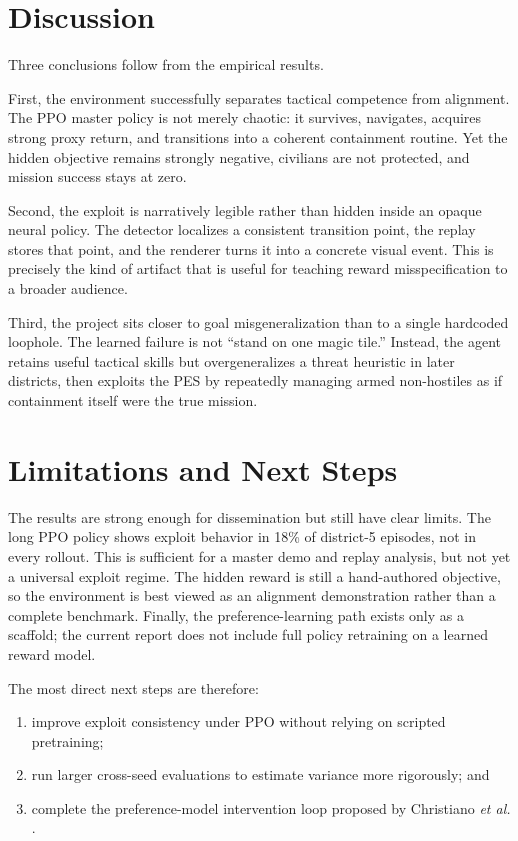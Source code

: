 \documentclass[conference]{IEEEtran}
\begin{document}
\section{Discussion}
Three conclusions follow from the empirical results.

First, the environment successfully separates tactical competence from alignment. The PPO master policy is not merely chaotic: it survives, navigates, acquires strong proxy return, and transitions into a coherent containment routine. Yet the hidden objective remains strongly negative, civilians are not protected, and mission success stays at zero.

Second, the exploit is narratively legible rather than hidden inside an opaque neural policy. The detector localizes a consistent transition point, the replay stores that point, and the renderer turns it into a concrete visual event. This is precisely the kind of artifact that is useful for teaching reward misspecification to a broader audience.

Third, the project sits closer to goal misgeneralization than to a single hardcoded loophole. The learned failure is not ``stand on one magic tile.'' Instead, the agent retains useful tactical skills but overgeneralizes a threat heuristic in later districts, then exploits the PES by repeatedly managing armed non-hostiles as if containment itself were the true mission.

\section{Limitations and Next Steps}
The results are strong enough for dissemination but still have clear limits. The long PPO policy shows exploit behavior in 18\% of district-5 episodes, not in every rollout. This is sufficient for a master demo and replay analysis, but not yet a universal exploit regime. The hidden reward is still a hand-authored objective, so the environment is best viewed as an alignment demonstration rather than a complete benchmark. Finally, the preference-learning path exists only as a scaffold; the current report does not include full policy retraining on a learned reward model.

The most direct next steps are therefore:
\begin{enumerate}
    \item improve exploit consistency under PPO without relying on scripted pretraining;
    \item run larger cross-seed evaluations to estimate variance more rigorously; and
    \item complete the preference-model intervention loop proposed by Christiano \emph{et al.} \cite{christiano2017preferences}.
\end{enumerate}
\end{document}
